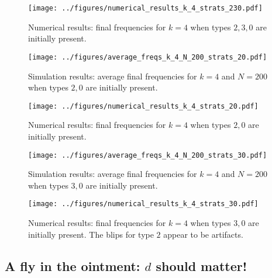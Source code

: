 \documentclass[13pt]{amsart}
\begin{document}
\begin{figure}
    \texttt{[image: ../figures/numerical\_results\_k\_4\_strats\_230.pdf]}
    \caption{Numerical results: final frequencies for $k = 4$ when types $2, 3, 0$ are initially present.}
\end{figure}

\begin{figure}
    \texttt{[image: ../figures/average\_freqs\_k\_4\_N\_200\_strats\_20.pdf]}
    \caption{Simulation results: average final frequencies for $k = 4$ and $N = 200$ when types $2, 0$ are initially present.}
\end{figure}

\begin{figure}
    \texttt{[image: ../figures/numerical\_results\_k\_4\_strats\_20.pdf]}
    \caption{Numerical results: final frequencies for $k = 4$ when types $2, 0$ are initially present.}
\end{figure}

\begin{figure}
    \texttt{[image: ../figures/average\_freqs\_k\_4\_N\_200\_strats\_30.pdf]}
    \caption{Simulation results: average final frequencies for $k = 4$ and $N = 200$ when types $3, 0$ are initially present.}
\end{figure}


\begin{figure}
    \texttt{[image: ../figures/numerical\_results\_k\_4\_strats\_30.pdf]}
    \caption{Numerical results: final frequencies for $k = 4$ when types $3, 0$ are initially present.
    The blips for type $2$ appear to be artifacts.}
\end{figure}

\clearpage

\subsection*{A fly in the ointment: $d$ should matter!}
\end{document}
